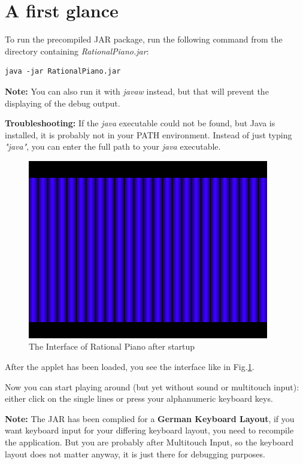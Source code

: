 \documentclass[12pt,a4paper,titlepage,oneside]{report}
\begin{document}
\section{A first glance}

To run the precompiled JAR package, run the following command from the directory containing \textit{RationalPiano.jar}:

\begin{verbatim}
java -jar RationalPiano.jar
\end{verbatim}

\textbf{Note:} You can also run it with \textit{javaw} instead, but that will prevent the displaying of the debug output.

\textbf{Troubleshooting:} If the \textit{java} executable could not be found, but Java is installed, it is probably not in your PATH environment. Instead of just typing \textit{"java"}, you can enter the full path to your \textit{java} executable.

\begin{figure}[!ht]
\includegraphics[width=\textwidth]{images/interface.png}
\centering
\caption{The Interface of Rational Piano after startup}
\label{fig:interface}
\end{figure}

After the applet has been loaded, you see the interface like in Fig.\ref{fig:interface}.

Now you can start playing around (but yet without sound or multitouch input): either click on the single lines or press your alphanumeric keyboard keys.

\textbf{Note:} The JAR has been complied for a \textbf{German Keyboard Layout}, if you want keyboard input for your differing keyboard layout, you need to recompile the application. But you are probably after Multitouch Input, so the keyboard layout does not matter anyway, it is just there for debugging purposes.
\end{document}
